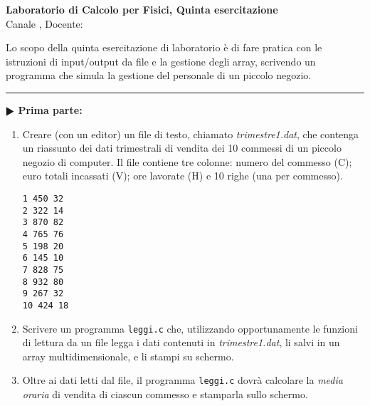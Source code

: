 \documentclass[11pt]{article}
\begin{document}
\pagestyle{empty}

\begin{center}
{\Large \bf  Laboratorio di Calcolo per Fisici, Quinta esercitazione\\[2mm]}
{\large Canale \canale, Docente: \docente}
\end{center}
\vspace{4mm}

\begin{mdframed}[backgroundcolor=panna]
  Lo scopo della quinta esercitazione di laboratorio \`e di fare pratica con
le istruzioni di input/output da file e la gestione degli array, scrivendo un programma
che simula la gestione del personale di un piccolo negozio.
  \end{mdframed}
%
%



\hrule
\vspace{2mm}
\textbf{$\RHD$ Prima parte:}
\begin{enumerate}
\item Creare (con un editor) un file di testo, chiamato {\em trimestre1.dat}, che 
contenga un riassunto dei dati trimestrali di vendita dei 10 commessi di
un piccolo negozio di computer. Il file contiene tre colonne: numero del commesso (C);  euro totali incassati (V); ore lavorate (H) e
10 righe (una per commesso).
\begin{mdframed}[backgroundcolor=panna]
\texttt{1    450   32\\
2    322   14\\
3    870   82\\
4    765   76\\
5    198   20\\
6    145   10\\
7    828   75\\
8    932   80\\
9    267   32\\
10   424   18}
\end{mdframed}

\item Scrivere un programma \texttt{leggi.c} che, utilizzando opportunamente le funzioni di lettura da un file 
legga i dati contenuti in {\em trimestre1.dat}, li salvi in un array multidimensionale, e li stampi su schermo.

\item Oltre ai dati letti dal file, il programma \texttt{leggi.c} dovrà
calcolare la {\em media oraria\/} di vendita di ciascun commesso e stamparla sullo schermo.
\end{enumerate}
\end{document}
